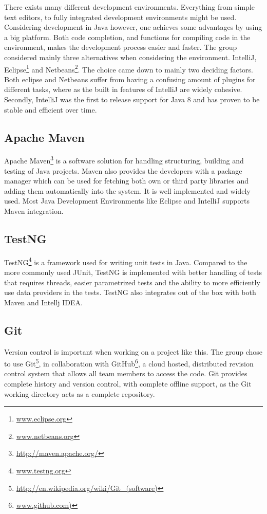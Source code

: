 There exists many different development environments. Everything from simple text editors, to fully integrated development environments might be used. Considering development in Java however, one achieves some advantages by using a big platform. Both code completion, and functions for compiling code in the environment, makes the development process easier and faster. The group considered mainly three alternatives when considering the environment. IntelliJ, Eclipse\footnote{\url{www.eclipse.org}} and Netbeans\footnote{\url{www.netbeans.org}}. The choice came down to mainly two deciding factors. Both eclipse and Netbeans suffer from having a confusing amount of plugins for different tasks, where as the built in features of IntelliJ are widely cohesive. Secondly, IntelliJ was the first to release support for Java 8 and has proven to be stable and efficient over time.

\subsection{Apache Maven}

Apache Maven\footnote{\url{http://maven.apache.org/}} is a software solution for handling structuring, building and testing of Java projects. Maven also provides the developers with a package manager which can be used for fetching both own or third party libraries and adding them automatically into the system. It is well implemented and widely used. Most Java Development Environments like Eclipse and IntelliJ supports Maven integration.

\subsection{TestNG}

TestNG\footnote{\url{www.testng.org}} is a framework used for writing unit tests in Java. Compared to the more commonly used JUnit, TestNG is implemented with better handling of tests that requires threads, easier parametrized tests and the ability to more efficiently use data providers in the tests. TestNG also integrates out of the box with both Maven and Intellj IDEA.

\subsection{Git}

Version control is important when working on a project like this. The group chose to use Git\footnote{\url{http://en.wikipedia.org/wiki/Git_(software)}}, in collaboration with GitHub\footnote{\url{www.github.com)}}, a cloud hosted, distributed revision control system that allows all team members to access the code. Git provides complete history and version control, with complete offline support, as the Git working directory acts as a complete repository.

